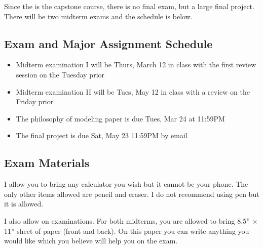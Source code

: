 \documentclass[12pt]{article}
\begin{document}
Since the is the capstone course, there is no final exam, but a large final project. There will be two midterm exams and the schedule is below.

\subsection*{Exam and Major Assignment Schedule}\label{subsec:exam_schedule}

\begin{itemize}
\itemsep -0.0em 
\item Midterm examination I will be Thurs, March 12 in class with the first review session on the Tuesday prior
\item Midterm examination II will be Tues, May 12 in class with a review on the Friday prior
\item The philosophy of modeling paper is due Tues, Mar 24 at 11:59PM
\item The final project is due Sat, May 23 11:59PM by email
\end{itemize}

\subsection*{Exam Materials}

I allow you to bring any calculator you wish but it cannot be your phone. The only other items allowed are pencil and eraser. I do not recommend using pen but it is allowed.

I also allow  on examinations. For both midterms, you are allowed to bring  8.5'' $\times$ 11'' sheet of paper (front and back).  On this paper you can write anything you would like which you believe will help you on the exam. %


%
%
\end{document}
